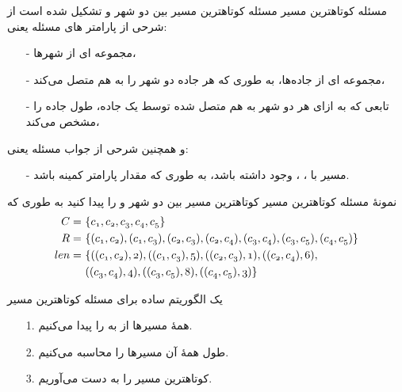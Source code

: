 \begin{frame}{مسئله کوتاهترین مسیر}
مسئله کوتاهترین مسیر بین دو شهر
و
تشکیل شده است از شرحی از پارامتر های مسئله یعنی:
\begin{itemize}\itmsep{2mm}
\item[-]
مجموعه ای از شهرها،
\item[-]
مجموعه ای از جاده‌ها، به طوری که هر جاده دو شهر را به هم متصل می‌کند،
\item[-]
تابعی که به ازای هر دو شهر به هم متصل شده توسط یک جاده، طول جاده را مشخص می‌کند،
\end{itemize}

و همچنین شرحی از جواب مسئله یعنی:
\begin{itemize}\itmsep{5mm}
\item[-]
مسیر
با
،
،
وجود داشته باشد، به طوری که
مقدار پارامتر
 کمینه باشد.

\begin{center}
\end{center}

\end{itemize}
\end{frame}

\begin{frame}{نمونهٔ مسئله کوتاهترین مسیر}
کوتاهترین مسیر بین دو شهر
و
را پیدا کنید به طوری که
\begin{align*}
\mathnormal{C} =~& \mathnormal{ \{ c_1, c_2, c_3, c_4, c_5 \}} \\
\mathnormal{R} =~& \mathnormal{\{ (c_1, c_2), (c_1,c_3), (c_2, c_3), (c_2, c_4), (c_3, c_4), (c_3, c_5), (c_4, c_5) \}} \\
\mathnormal{len} =~& \mathnormal{\{ ((c_1, c_2),2), ((c_1,c_3),5), ((c_2, c_3),1), ((c_2, c_4),6),}  \\
~& \mathnormal{((c_3, c_4),4), ((c_3, c_5),8), ((c_4, c_5),3) \}}
\end{align*}

\begin{figure}[!ht]
  \centering
  
  \label{fig:g1}
\end{figure}

\end{frame}

\begin{frame}{یک الگوریتم ساده برای مسئله کوتاهترین مسیر}
\begin{itemize}\itmsep{2mm}
\item[1.] همهٔ مسیرها از 
به
را پیدا می‌کنیم.
\item[2.]
طول همهٔ آن مسیرها را محاسبه می‌کنیم.
\item[3.]
کوتاهترین مسیر را به دست می‌آوریم.
\end{itemize}
\end{frame}


